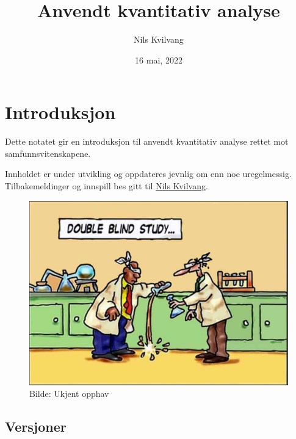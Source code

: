 \documentclass[
]{article}
\title{Anvendt kvantitativ analyse}
\author{Nils Kvilvang}
\date{16 mai, 2022}
\begin{document}
\maketitle

{
\setcounter{tocdepth}{2}
\tableofcontents
}
\hypertarget{introduksjon}{%
\section*{Introduksjon}\label{introduksjon}}

Dette notatet gir en introduksjon til anvendt kvantitativ analyse rettet mot samfunnsvitenskapene.

Innholdet er under utvikling og oppdateres jevnlig om enn noe uregelmessig. Tilbakemeldinger og innspill bes gitt til \href{mailto:nils.kvilvang@inn.no}{Nils Kvilvang}.

\begin{figure}
\centering
\includegraphics{Doubleblind.png}
\caption{Bilde: Ukjent opphav}
\end{figure}

\hypertarget{versjoner}{%
\subsection*{Versjoner}\label{versjoner}}
\end{document}
